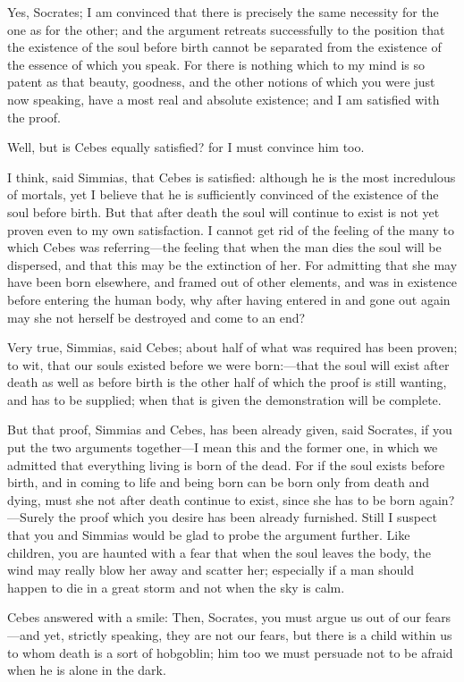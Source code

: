 Yes, Socrates; I am convinced that there is precisely the same necessity
for the one as for the other; and the argument retreats successfully to
the position that the existence of the soul before birth cannot be
separated from the existence of the essence of which you speak. For there
is nothing which to my mind is so patent as that beauty, goodness, and the
other notions of which you were just now speaking, have a most real and
absolute existence; and I am satisfied with the proof.

Well, but is Cebes equally satisfied? for I must convince him too.

I think, said Simmias, that Cebes is satisfied: although he is the most
incredulous of mortals, yet I believe that he is sufficiently convinced of
the existence of the soul before birth. But that after death the soul will
continue to exist is not yet proven even to my own satisfaction. I cannot
get rid of the feeling of the many to which Cebes was referring—the
feeling that when the man dies the soul will be dispersed, and that this
may be the extinction of her. For admitting that she may have been born
elsewhere, and framed out of other elements, and was in existence before
entering the human body, why after having entered in and gone out again
may she not herself be destroyed and come to an end?

Very true, Simmias, said Cebes; about half of what was required has been
proven; to wit, that our souls existed before we were born:—that the
soul will exist after death as well as before birth is the other half of
which the proof is still wanting, and has to be supplied; when that is
given the demonstration will be complete.

But that proof, Simmias and Cebes, has been already given, said Socrates,
if you put the two arguments together—I mean this and the former
one, in which we admitted that everything living is born of the dead. For
if the soul exists before birth, and in coming to life and being born can
be born only from death and dying, must she not after death continue to
exist, since she has to be born again?—Surely the proof which you
desire has been already furnished. Still I suspect that you and Simmias
would be glad to probe the argument further. Like children, you are
haunted with a fear that when the soul leaves the body, the wind may
really blow her away and scatter her; especially if a man should happen to
die in a great storm and not when the sky is calm.

Cebes answered with a smile: Then, Socrates, you must argue us out of our
fears—and yet, strictly speaking, they are not our fears, but there
is a child within us to whom death is a sort of hobgoblin; him too we must
persuade not to be afraid when he is alone in the dark.

